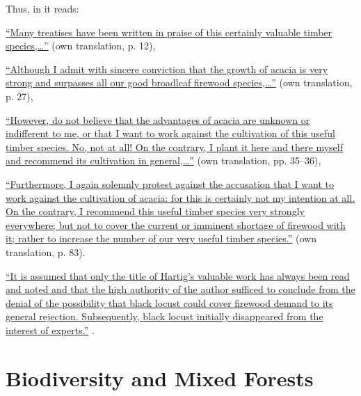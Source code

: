 Thus, in \citet{hartig1798robinie} it reads:

\hyperlink{german:hartig1798robinieA}{\enquote{Many treatises have been written in praise of this certainly
  valuable timber species,\dots}} (own translation, p. 12),

\hyperlink{german:hartig1798robinieB}{\enquote{Although I admit with sincere conviction that the growth of acacia
  is very strong and surpasses all our good broadleaf firewood species,\dots}} (own translation, p. 27),

\hyperlink{german:hartig1798robinieC}{\enquote{However, do not believe that the advantages of acacia are unknown
  or indifferent to me, or that I want to work against the cultivation
  of this useful timber species. No, not at all! On the contrary,
  I plant it here and there myself and recommend its cultivation in general,\dots}} (own translation, pp. 35--36),

\hyperlink{german:hartig1798robinieD}{\enquote{Furthermore, I again solemnly protest against the accusation
  that I want to work against the cultivation of acacia: for this is
  certainly not my intention at all. On the contrary, I recommend this
  useful timber species very strongly everywhere; but not to cover the
  current or imminent shortage of firewood with it; rather to increase
  the number of our very useful timber species.}}
(own translation, p. 83).

\hyperlink{german:erteld1952robinieErtragB}{\enquote{It is assumed that only the title of Hartig's valuable work
  has always been read and noted and that the high authority of the author
  sufficed to conclude from the denial of the possibility that black locust
  could cover firewood demand to its general rejection. Subsequently,
  black locust initially disappeared from the interest of experts.}}
\citep[own translation]{erteld1952robinieErtrag}.


\section{Biodiversity and Mixed Forests}


